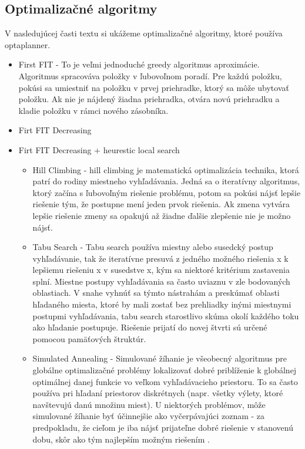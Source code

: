 \subsection{Optimalizačné algoritmy}
V nasledujúcej časti textu si ukážeme optimalizačné algoritmy, ktoré používa optaplanner.
\begin{itemize}
\item First FIT - To je veľmi jednoduché greedy algoritmus aproximácie. Algoritmus spracováva položky v ľubovoľnom poradí. Pre každú položku, pokúsi sa umiestniť na položku v prvej priehradke, ktorý sa môže ubytovať položku. Ak nie je nájdený žiadna priehradka, otvára novú priehradku a kladie položku v rámci nového zásobníka.

\item Firt FIT Decreasing
\item Firt FIT Decreasing + heurestic local search

\begin{itemize}
\item Hill Climbing - hill climbing je matematická optimalizácia technika, ktorá patrí do rodiny miestneho vyhľadávania. Jedná sa o iteratívny algoritmus, ktorý začína s ľubovoľným riešenie problému, potom sa pokúsi nájsť lepšie riešenie tým, že postupne mení jeden prvok riešenia. Ak zmena vytvára lepšie riešenie zmeny sa opakujú až žiadne ďalšie zlepšenie nie je možno nájsť.\cite{algobook}




\item Tabu Search - Tabu search používa miestny alebo susedcký postup vyhľadávanie, tak že iteratívne presuvá z jedného možného riešenia x k lepšiemu riešeniu x  v susedstve x, kým sa niektoré kritérium zastavenia splní. Miestne postupy vyhľadávania sa často uviaznu v zle bodovaných oblastiach. V snahe vyhnúť sa týmto nástrahám a preskúmať oblasti hľadaného miesta, ktoré by mali zostať bez prehliadky inými miestnymi postupmi vyhľadávania, tabu search starostlivo skúma okolí každého toku ako hľadanie postupuje. Riešenie prijatí do novej štvrti  sú určené pomocou pamäťových štruktúr.

\item Simulated Annealing - Simulované žíhanie je všeobecný algoritmus pre globálne optimalizačné problémy lokalizovať dobré priblíženie k globálnej optimálnej danej funkcie vo veľkom vyhľadávacieho priestoru. To sa často používa pri hľadaní priestorov diskrétnych (napr. všetky výlety, ktoré navštevujú danú množinu miest). U niektorých problémov, môže simulované žíhanie byť účinnejšie ako vyčerpávajúci zoznam - za predpokladu, že cieľom je iba nájsť prijateľne dobré riešenie v stanovenú dobu, skôr ako tým najlepším možným riešením .

\end{itemize}

\end{itemize}


